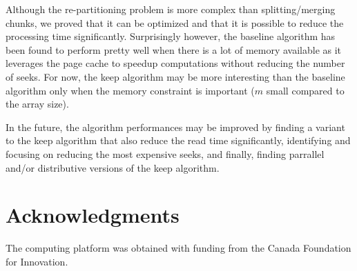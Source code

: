 \documentclass[conference]{IEEEtran}
\begin{document}
Although the re-partitioning problem is more complex than splitting/merging chunks,
we proved that it can be optimized and that it is possible to reduce the
processing time significantly.
Surprisingly however, the baseline algorithm has been found to perform pretty
well when there is a lot of memory available as it leverages the page cache to
speedup computations without reducing the number of seeks.
For now, the keep algorithm may be more interesting than the baseline algorithm
only when the memory constraint is important ($m$ small compared to the array size).

In the future, the algorithm performances may be improved by finding a variant
to the keep algorithm that also reduce the read time significantly,
identifying and focusing on reducing the most expensive seeks,
and finally, finding parrallel and/or distributive versions of the keep algorithm.

\section{Acknowledgments}

The computing platform was obtained with funding from the Canada Foundation for Innovation.



\end{document}
